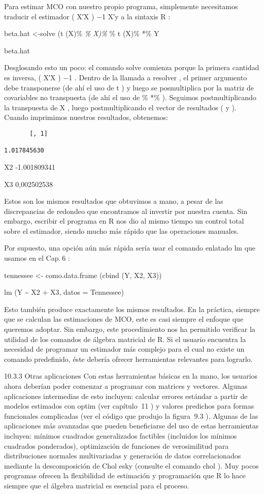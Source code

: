 \documentclass[
]{book}
\begin{document}
Para estimar MCO con nuestro propio programa, simplemente necesitamos traducir el estimador ( X′X ) −1 X′y a la sintaxis R :

beta.hat \textless-solve (t (X)\% \emph{\% X)\% }\% t (X)\% *\% Y

beta.hat

Desglosando esto un poco: el comando solve comienza porque la primera cantidad es inversa, ( X′X ) −1 . Dentro de la llamada a resolver , el primer argumento debe transponerse (de ahí el uso de t ) y luego se posmultiplica por la matriz de covariables no transpuesta (de ahí el uso de \% *\% ). Seguimos postmultiplicando la transpuesta de X , luego postmultiplicando el vector de resultados ( y ). Cuando imprimimos nuestros resultados, obtenemos:

\begin{verbatim}
       [, 1]

1.017845630
\end{verbatim}

X2 -1.001809341

X3 0,002502538

Estos son los mismos resultados que obtuvimos a mano, a pesar de las discrepancias de redondeo que encontramos al invertir por nuestra cuenta. Sin embargo, escribir el programa en R nos dio al mismo tiempo un control total sobre el estimador, siendo mucho más rápido que las operaciones manuales.

Por supuesto, una opción aún más rápida sería usar el comando enlatado lm que usamos en el Cap. 6 :

tennessee \textless- como.data.frame (cbind (Y, X2, X3))

lm (Y \textasciitilde{} X2 + X3, datos = Tennessee)

Esto también produce exactamente los mismos resultados. En la práctica, siempre que se calculan las estimaciones de MCO, este es casi siempre el enfoque que queremos adoptar. Sin embargo, este procedimiento nos ha permitido verificar la utilidad de los comandos de álgebra matricial de R. Si el usuario encuentra la necesidad de programar un estimador más complejo para el cual no existe un comando predefinido, éste debería ofrecer herramientas relevantes para lograrlo.

10.3.3 Otras aplicaciones
Con estas herramientas básicas en la mano, los usuarios ahora deberían poder comenzar a programar con matrices y vectores. Algunas aplicaciones intermedias de esto incluyen: calcular errores estándar a partir de modelos estimados con optim (ver capítulo  11 ) y valores predichos para formas funcionales complicadas (ver el código que produjo la figura  9.3 ). Algunas de las aplicaciones más avanzadas que pueden beneficiarse del uso de estas herramientas incluyen: mínimos cuadrados generalizados factibles (incluidos los mínimos cuadrados ponderados), optimización de funciones de verosimilitud para distribuciones normales multivariadas y generación de datos correlacionados mediante la descomposición de Chol esky (consulte el comando chol ). Muy pocos programas ofrecen la flexibilidad de estimación y programación que R lo hace siempre que el álgebra matricial es esencial para el proceso.
\end{document}
